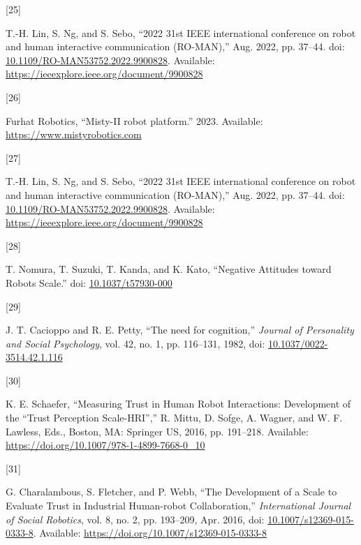 \documentclass[
  letterpaper,
  DIV=11,
  numbers=noendperiod]{scrartcl}
\newlength{\cslhangindent}
\newlength{\csllabelwidth}
\newenvironment{CSLReferences}[2] %
 {\begin{list}{}{%
  \setlength{\itemindent}{0pt}
  \setlength{\leftmargin}{0pt}
  \setlength{\parsep}{0pt}
  \ifodd #1
   \setlength{\leftmargin}{\cslhangindent}
   \setlength{\itemindent}{-1\cslhangindent}
  \fi
  \setlength{\itemsep}{#2\baselineskip}}}
 {\end{list}}
\newcommand{\CSLLeftMargin}[1]{\parbox[t]{\csllabelwidth}{\strut#1\strut}}
\newcommand{\CSLRightInline}[1]{\parbox[t]{\linewidth - \csllabelwidth}{\strut#1\strut}}
\begin{document}
\begin{CSLReferences}{0}{0}
\CSLLeftMargin{{[}25{]} }%
\CSLRightInline{T.-H. Lin, S. Ng, and S. Sebo, {``2022 31st IEEE
international conference on robot and human interactive communication
(RO-MAN),''} Aug. 2022, pp. 37--44. doi:
\href{https://doi.org/10.1109/RO-MAN53752.2022.9900828}{10.1109/RO-MAN53752.2022.9900828}.
Available: \url{https://ieeexplore.ieee.org/document/9900828}}

\CSLLeftMargin{{[}26{]} }%
\CSLRightInline{Furhat Robotics, {``Misty-II robot platform.''} 2023.
Available: \url{https://www.mistyrobotics.com}}

\CSLLeftMargin{{[}27{]} }%
\CSLRightInline{T.-H. Lin, S. Ng, and S. Sebo, {``2022 31st IEEE
international conference on robot and human interactive communication
(RO-MAN),''} Aug. 2022, pp. 37--44. doi:
\href{https://doi.org/10.1109/RO-MAN53752.2022.9900828}{10.1109/RO-MAN53752.2022.9900828}.
Available: \url{https://ieeexplore.ieee.org/document/9900828}}

\CSLLeftMargin{{[}28{]} }%
\CSLRightInline{T. Nomura, T. Suzuki, T. Kanda, and K. Kato, {``Negative
Attitudes toward Robots Scale.''} doi:
\href{https://doi.org/10.1037/t57930-000}{10.1037/t57930-000}}

\CSLLeftMargin{{[}29{]} }%
\CSLRightInline{J. T. Cacioppo and R. E. Petty, {``The need for
cognition,''} \emph{Journal of Personality and Social Psychology}, vol.
42, no. 1, pp. 116--131, 1982, doi:
\href{https://doi.org/10.1037/0022-3514.42.1.116}{10.1037/0022-3514.42.1.116}}

\CSLLeftMargin{{[}30{]} }%
\CSLRightInline{K. E. Schaefer, {``Measuring Trust in Human Robot
Interactions: Development of the {``}Trust Perception Scale-HRI{''},''}
R. Mittu, D. Sofge, A. Wagner, and W. F. Lawless, Eds., Boston, MA:
Springer US, 2016, pp. 191--218. Available:
\url{https://doi.org/10.1007/978-1-4899-7668-0_10}}

\CSLLeftMargin{{[}31{]} }%
\CSLRightInline{G. Charalambous, S. Fletcher, and P. Webb, {``The
Development of a Scale to Evaluate Trust in Industrial Human-robot
Collaboration,''} \emph{International Journal of Social Robotics}, vol.
8, no. 2, pp. 193--209, Apr. 2016, doi:
\href{https://doi.org/10.1007/s12369-015-0333-8}{10.1007/s12369-015-0333-8}.
Available: \url{https://doi.org/10.1007/s12369-015-0333-8}}


\end{CSLReferences}
\end{document}
